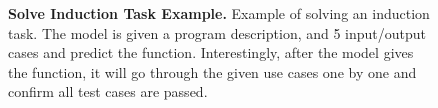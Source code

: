 \documentclass{article}
\begin{document}
\begin{figure}
    \caption{\textbf{Solve Induction Task Example.} Example of solving an induction task. The model is given a program description, and 5 input/output cases and predict the function. Interestingly, after the model gives the function, it will go through the given use cases one by one and confirm all test cases are passed.}
    \label{fig:pred_code_f_example}
\end{figure}



\end{document}
